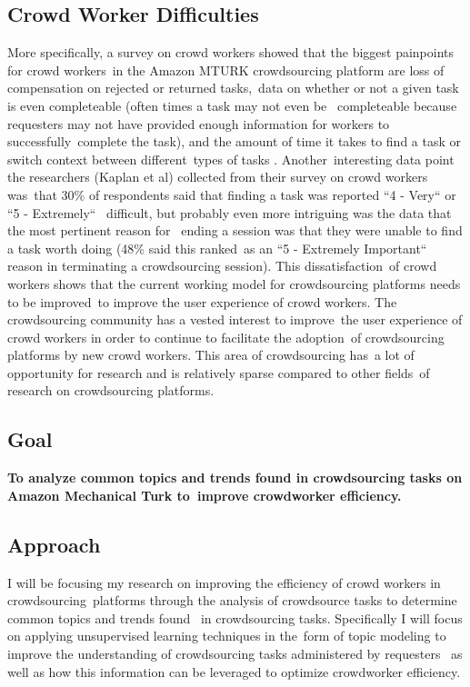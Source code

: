 \documentclass[letterpaper,12pt]{article}
\begin{document}
\subsection{Crowd Worker Difficulties}
More specifically, a survey on crowd workers showed that the biggest painpoints for crowd workers\
in the Amazon MTURK crowdsourcing platform are loss of compensation on rejected or returned tasks,\
data on whether or not a given task is even completeable (often times a task may not even be \
completeable because requesters may not have provided enough information for workers to successfully\
complete the task), and the amount of time it takes to find a task or switch context between different\
types of tasks \cite{Kaplan2018}. Another\
interesting data point the researchers (Kaplan et al) collected from their survey on crowd workers was\
that 30\% of respondents said that finding a task was reported ``4 - Very`` or ``5 - Extremely`` \
difficult, but probably even more intriguing was the data that the most pertinent reason for \
ending a session was that they were unable to find a task worth doing (48\% said this ranked\
as an ``5 - Extremely Important`` reason in terminating a crowdsourcing session). \cite{Kaplan2018} This dissatisfaction\
of crowd workers shows that the current working model for crowdsourcing platforms needs to be improved\
to improve the user experience of crowd workers.
The crowdsourcing community has a vested interest to improve\
the user experience of crowd workers in order to continue to facilitate the adoption\
of crowdsourcing platforms by new crowd workers. This area of crowdsourcing has\
a lot of opportunity for research and is relatively sparse compared to other fields\
of research on crowdsourcing platforms.

\subsection{Goal}
\textbf{To analyze common topics and trends found in crowdsourcing tasks on Amazon Mechanical Turk to\
 improve crowdworker efficiency.}

\subsection{Approach}
I will be focusing my research on improving the efficiency of crowd workers in crowdsourcing\
platforms through the analysis of crowdsource tasks to determine common topics and trends found \
in crowdsourcing tasks. Specifically I will focus on applying unsupervised learning techniques in the\
form of topic modeling to improve the understanding of crowdsourcing tasks administered by requesters \ 
as well as how this information can be leveraged to optimize crowdworker efficiency. 
\end{document}
